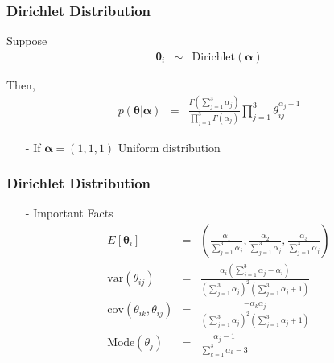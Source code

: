 \documentclass{beamer}
\numberwithin{equation}{section}
\begin{document}
\begin{frame}
\frametitle{Dirichlet Distribution}

Suppose 
\begin{eqnarray}
\boldsymbol{\theta}_{i} & \sim & \text{Dirichlet}(\boldsymbol{\alpha}) \nonumber 
\end{eqnarray}

Then, 
\begin{eqnarray}
p(\boldsymbol{\theta}|\boldsymbol{\alpha}) & = & \frac{\Gamma(\sum_{j=1}^{3} \alpha_{j})}{\prod_{j=1}^{3} \Gamma(\alpha_{j})} \prod_{j=1}^{3}  \theta_{ij}^{\alpha_{j} - 1}  \nonumber 
\end{eqnarray}

\begin{itemize}
\item[-] If $\boldsymbol{\alpha} = (1, 1, 1)$ \alert{Uniform distribution}
\end{itemize}




\end{frame}


\begin{frame}
\frametitle{Dirichlet Distribution}

\begin{itemize}
\item[-] Important Facts
\begin{eqnarray}
E[\boldsymbol{\theta}_{i}] & = &  \left(\frac{\alpha_{1} }{\sum_{j=1}^{3} \alpha_{j} }, \frac{\alpha_{2} }{\sum_{j=1}^{3} \alpha_{j} }, \frac{\alpha_{3} }{\sum_{j=1}^{3} \alpha_{j} }\right) \nonumber \\
\text{var}(\theta_{ij} ) & = & \frac{\alpha_{i}\left(\sum_{j=1}^{3} \alpha_{j} - \alpha_{i} \right)}{\left(\sum_{j=1}^{3} \alpha_{j}\right)^{2} \left(\sum_{j=1}^{3} \alpha_{j} + 1 \right)} \nonumber \\
\text{cov}(\theta_{ik}, \theta_{ij} ) & = & \frac{-\alpha_{k} \alpha_{j} }{ \left(\sum_{j=1}^{3} \alpha_{j}\right)^{2} \left(\sum_{j=1}^{3} \alpha_{j} + 1 \right)  } \nonumber \\
\text{Mode}(\theta_{j}) & = & \frac{\alpha_{j}  - 1}{\sum_{k=1}^{3} \alpha_{k} - 3} \nonumber 
\end{eqnarray}
\end{itemize}

\end{frame}
\end{document}
